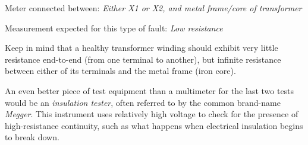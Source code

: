 \vskip 5pt
\item{} Meter connected between: {\it Either X1 or X2, and metal frame/core of transformer}
\vskip 5pt
\item{} Measurement expected for this type of fault: {\it Low resistance}

\vskip 30pt

Keep in mind that a healthy transformer winding should exhibit very little resistance end-to-end (from one terminal to another), but infinite resistance between either of its terminals and the metal frame (iron core).

\vskip 10pt

An even better piece of test equipment than a multimeter for the last two tests would be an {\it insulation tester}, often referred to by the common brand-name {\it Megger}.  This instrument uses relatively high voltage to check for the presence of high-resistance continuity, such as what happens when electrical insulation begins to break down.




